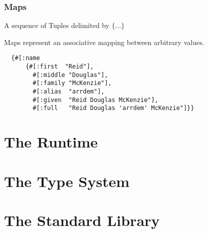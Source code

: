 \documentclass{report}
\begin{document}
\subsection{Maps}

A sequence of Tuples delimited by $\{ ... \}$

Maps represent an associative mapping between arbitrary values.

\begin{lstlisting}
  {#[:name
      {#[:first  "Reid"],
        #[:middle "Douglas"],
        #[:family "McKenzie"],
        #[:alias  "arrdem"],
        #[:given  "Reid Douglas McKenzie"],
        #[:full   "Reid Douglas 'arrdem' McKenzie"]}}
\end{lstlisting}

\chapter{The Runtime}

\chapter{The Type System}

\chapter{The Standard Library}
\end{document}
